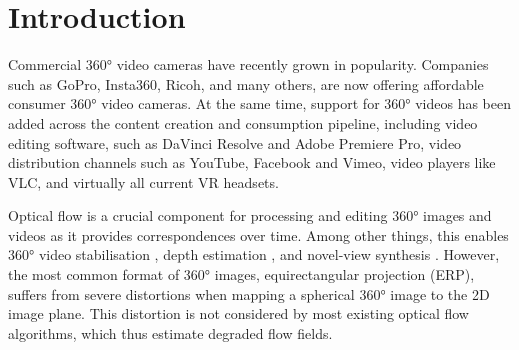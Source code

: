 \section{Introduction}
\label{sec:intro}

Commercial 360° video cameras have recently grown in popularity.
Companies such as GoPro, Insta360, Ricoh, and many others, are now offering affordable consumer 360° video cameras.
%
At the same time, support for 360° videos has been added across the content creation and consumption pipeline, including video editing software, such as DaVinci Resolve and Adobe Premiere Pro,
video distribution channels such as YouTube, Facebook and Vimeo,
video players like VLC, and virtually all current VR headsets.


Optical flow is a crucial component for processing and editing 360° images and videos as it provides correspondences over time.
Among other things, this enables 360° video stabilisation \cite{Kopf2016}, depth estimation \cite{ZioulKZAD2019}, and novel-view synthesis \cite{BerteYLR2020}.
%
However, the most common format of 360° images, equirectangular projection (ERP), suffers from severe distortions when mapping a spherical 360° image to the 2D image plane.
This distortion is not considered by most existing optical flow algorithms, which thus estimate degraded flow fields.


